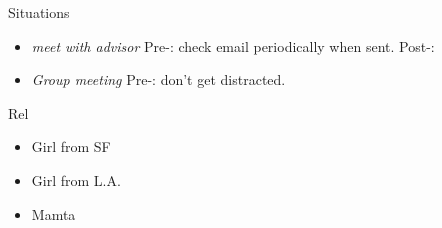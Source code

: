 \begin{frame}
\begin{columns}
\begin{column}{0.20\linewidth}
      \begin{block}{Situations}

        \begin{itemize} 
          
          \tiny \item \tiny \textit{meet with advisor} Pre-: check
          email periodically when sent. Post-: 
  
        \item \tiny \textit{Group meeting} Pre-: don't get
          distracted. 

        \end{itemize} 

      \end{block}
      
\begin{block}{Rel}
  \begin{itemize} 
    \small \item \small Girl from SF 
    \small \item \small Girl from L.A. 
    \small \item \small Mamta 

  \end{itemize} 
\end{block} 
\end{column}%

\end{columns}

\end{frame}

